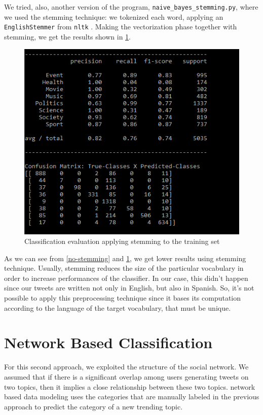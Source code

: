\documentclass[journal,11pt]{vgtc}
\begin{document}
We tried, also, another version of the program, \texttt{naive\_bayes\_stemming.py}, where we used the stemming technique:
we tokenized each word, applying an \texttt{EnglishStemmer} from \texttt{nltk} \cite{nltk}.
Making the vectorization phase together with stemming, we get the results shown in \ref{stemming}.
 
\begin{figure}[h]
 \centering
 \includegraphics[scale=0.5]{naive_bayes_stemming}
 \caption{Classification evaluation applying stemming to the training set}
 \label{stemming}
\end{figure}

As we can see from \ref{no-stemming} and \ref{stemming}, we get lower results using stemming technique. Usually, stemming reduces the size of the particular vocabulary in order to increase performances of the classifier. In our case, this didn't happen since our tweets are written not only in English, but also in Spanish. So, it's not possible to apply this preprocessing technique since it bases its computation according to the language of the target vocabulary, that must be unique.

\section{Network Based Classification}
For this second approach, we exploited the structure of the social network. We assumed that if there is a significant overlap among users
generating tweets on two topics, then it implies a close relationship between these two topics.
network based data modeling uses the categories that are manually labeled in the previous approach to predict
the category of a new trending topic.
\end{document}
